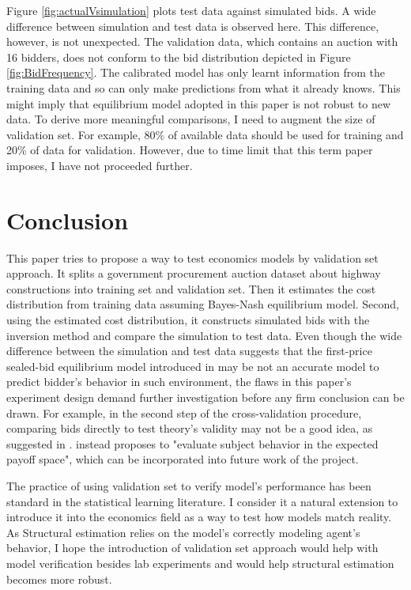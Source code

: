 \documentclass[11pt]{article}
\begin{document}
Figure \ref{fig:actualVsimulation} plots test data against simulated bids. 
A wide difference between simulation and test data is observed here. 
This difference, however, is not unexpected. 
The validation data, which contains an auction with 16 bidders, does not conform 
to the bid distribution depicted in Figure \ref{fig:BidFrequency}. 
The calibrated model has only learnt information from the training data and 
so can only make predictions from what it already knows. This might imply that 
equilibrium model adopted in this paper is not robust to new data. 
To derive more meaningful comparisons, I need to augment the size of validation set.
For example, 80\% of available data should be used for training and 20\% of 
data for validation. 
However, due to time limit that this term paper imposes, I have not proceeded 
further. 

\section{Conclusion}
This paper tries to propose a way to test economics models by validation set approach. 
It splits a government 
procurement auction dataset about highway constructions into training set and 
validation set. Then it estimates the 
cost distribution from training data assuming Bayes-Nash equilibrium model. 
Second, using the 
estimated cost distribution, it constructs simulated bids with the 
inversion method and compare the simulation to test data. 
Even though the wide difference between the simulation and test data suggests
that the first-price sealed-bid equilibrium model introduced in 
\citeauthor{RileySamuelson1981} \citeyear{RileySamuelson1981}
may be not an accurate model to predict bidder's 
behavior in such environment, the flaws in this paper's experiment design 
demand further investigation before any firm conclusion can be drawn. 
For example, 
in the second step of the cross-validation procedure, comparing bids 
directly to test theory's validity may not be a good idea, as suggested in 
\citeauthor{Harrison1989} \citeyear{Harrison1989}. \citeauthor{Harrison1989}
\citeyear{Harrison1989} instead proposes to "evaluate subject behavior in the 
expected payoff space", which can be incorporated into future work of the project.

The practice of using validation set to verify model's performance
has been standard in the statistical learning 
literature. I consider 
it a natural extension to introduce it into the economics field as a way to 
test how models match reality. As Structural estimation 
relies on the model's correctly modeling agent's behavior,
I hope the introduction of validation set approach would help with model 
verification besides lab experiments and would help structural estimation 
becomes more robust. 


\medskip



\end{document}
